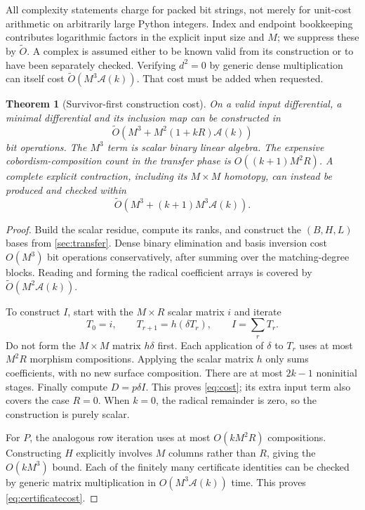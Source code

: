 \documentclass[11pt,letterpaper]{article}
\newtheorem{theorem}{Theorem}[section]
\theoremstyle{definition}
\theoremstyle{remark}
\newcommand{\A}{\mathcal A}
\begin{document}
All complexity statements charge for packed bit strings, not merely for
unit-cost arithmetic on arbitrarily large Python integers. Index and endpoint
bookkeeping contributes logarithmic factors in the explicit input size and
$M$; we suppress these by $\widetilde O$. A complex is assumed either to be
known valid from its construction or to have been separately checked.
Verifying $d^2=0$ by generic dense multiplication can itself cost
$\widetilde O(M^3\A(k))$. That cost must be added when requested.

\begin{theorem}[Survivor-first construction cost]\label{thm:cost}
On a valid input differential, a minimal differential and its inclusion map
can be constructed in
\begin{equation}\label{eq:cost}
 \widetilde O\!\left(M^3+M^2(1+kR)\A(k)\right)
\end{equation}
bit operations. The $M^3$ term is scalar binary linear algebra. The expensive
cobordism-composition count in the transfer phase is $O((k+1)M^2R)$.
A complete explicit contraction, including its $M\times M$ homotopy, can
instead be produced and checked within
\begin{equation}\label{eq:certificatecost}
 \widetilde O\!\left(M^3+(k+1)M^3\A(k)\right).
\end{equation}
\end{theorem}
\begin{proof}
Build the scalar residue, compute its ranks, and construct the $(B,H,L)$ bases
from \cref{sec:transfer}. Dense binary elimination and basis inversion cost
$O(M^3)$ bit operations conservatively, after summing over the matching-degree
blocks. Reading and forming the radical coefficient arrays is covered by
$\widetilde O(M^2\A(k))$.

To construct $I$, start with the $M\times R$ scalar matrix $i$ and iterate
\begin{equation}\label{eq:iteration}
 T_0=i,\qquad T_{r+1}=h(\delta T_r),\qquad I=\sum_rT_r.
\end{equation}
Do not form the $M\times M$ matrix $h\delta$ first. Each application of
$\delta$ to $T_r$ uses at most $M^2R$ morphism compositions. Applying the
scalar matrix $h$ only sums coefficients, with no new surface composition.
There are at most $2k-1$ noninitial stages. Finally compute $D=p\delta I$.
This proves \cref{eq:cost}; its extra input term also covers the case $R=0$.
When $k=0$, the radical remainder is zero, so the construction is purely scalar.

For $P$, the analogous row iteration uses at most $O(kM^2R)$ compositions.
Constructing $H$ explicitly involves $M$ columns rather than $R$, giving the
$O(kM^3)$ bound. Each of the finitely many certificate identities can be
checked by generic matrix multiplication in $O(M^3\A(k))$ time. This proves
\cref{eq:certificatecost}.
\end{proof}
\end{document}
